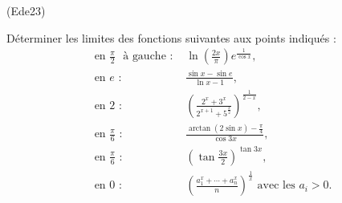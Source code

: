 \begin{tiny}(Ede23)\end{tiny} D{\'e}terminer les limites des fonctions suivantes aux points
indiqu{\'e}s :
\begin{align*}
&\text{en }\frac{\pi }{2}\text{ {\`a} gauche : } &\ln \left( \frac{2x}{\pi }\right) e^{\frac{1}{\cos x}}, \\
&\text{en }e\text{ : } &\frac{\sin x-\sin e}{\ln x-1}, \\
&\text{en }2\text{ : } &\left( \frac{2^{x}+3^{x}}{2^{x+1}+5^{\frac{x}{2}}}\right)^{\frac{1}{2-x}}, \\
&\text{en }\frac{\pi }{6}\text{ : } &\frac{\arctan (2\sin x)-\frac{\pi }{4}}{\cos 3x}, \\
&\text{en }\frac{\pi }{6}\text{ : } &\left( \tan \frac{3x}{2}\right)^{\tan 3x},\\
&\text{en }0\text{ : } &\left( \frac{a_1^x + \cdots + a_n^x}{n}\right)^{\frac{1}{x}}
\text{ avec les } a_i > 0.
\end{align*}

